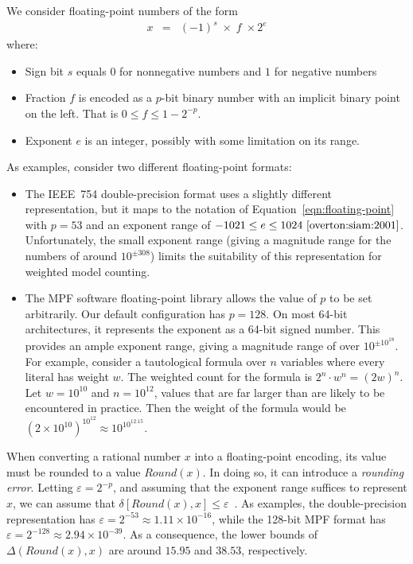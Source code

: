 \documentclass[letterpaper,USenglish,cleveref, autoref, thm-restate]{lipics-v2021}
\newcommand{\round}{\mathit{Round}}
\newcommand{\aerror}{\delta}
\newcommand{\digitprecision}{\Delta}
\newcommand{\roundepsilon}{\varepsilon}
\begin{document}
We consider floating-point numbers of the form
\begin{eqnarray}
x & = & (-1)^s \; \times \; f \; \times 2^{e} \label{eqn:floating-point}
\end{eqnarray}
where:
\begin{itemize}
\item Sign bit $s$ equals $0$ for nonnegative numbers and $1$ for negative numbers
\item Fraction $f$ is encoded as a $p$-bit binary number with an implicit binary point on the left.  That is $0 \leq f \leq 1-2^{-p}$.
\item Exponent $e$ is an integer, possibly with some limitation on its range.
\end{itemize}
As examples, consider two different floating-point formats:
\begin{itemize}
\item The IEEE~754 double-precision format uses a slightly different representation, but it maps to the notation of Equation~\ref{eqn:floating-point} with $p=53$ and an exponent range of
  $-1021 \leq e \leq 1024~\cite{overton:siam:2001}$.  Unfortunately, the small exponent range (giving a magnitude range for the numbers of around $10^{\pm 308}$) limits the suitability of
  this representation for weighted model counting.
\item The MPF software floating-point library allows the value of $p$
  to be set arbitrarily.  Our default configuration has $p=128$. On
  most 64-bit architectures, it represents the exponent as a 64-bit
  signed number.  This provides an ample exponent range, giving a
  magnitude range of over $10^{\pm 10^{18}}$.  For example, consider a
  tautological formula over $n$ variables where every literal has
  weight $w$.  The weighted count for the formula is
  $2^n\cdot w^n = (2w)^n$.  Let $w = 10^{10}$ and $n = 10^{12}$, values that are far larger than are likely to be encountered in practice.  Then
  the weight of the formula would be $(2 \times 10^{10})^{10^{12}}
  \approx 10^{10^{12.15}}$.
\end{itemize}

When converting a rational number $x$ into a floating-point encoding, its value must be rounded to a
value $\round(x)$.  In doing so, it can introduce a \emph{rounding
error}.  
Letting $\roundepsilon = 2^{-p}$, and assuming that
the exponent range suffices to represent $x$,
we can assume that
$\aerror[\round(x), x] \leq \roundepsilon$~\cite{knuth:fp:1981}.
As examples, the double-precision representation has $\roundepsilon = 2^{-53} \approx 1.11 \times 10^{-16}$, while the 128-bit MPF format
has $\roundepsilon = 2^{-128} \approx 2.94 \times 10^{-39}$.  As a consequence, the lower bounds of $\digitprecision(\round(x), x)$ are around $15.95$ and $38.53$, respectively.
\end{document}
